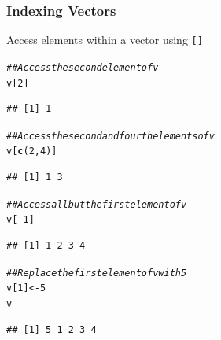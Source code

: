 \documentclass{beamer}\usepackage[]{graphicx}\usepackage[]{color}
\makeatletter
\newcommand{\hlnum}[1]{\textcolor[rgb]{0.686,0.059,0.569}{#1}}%
\newcommand{\hlcom}[1]{\textcolor[rgb]{0.678,0.584,0.686}{\textit{#1}}}%
\newcommand{\hlopt}[1]{\textcolor[rgb]{0,0,0}{#1}}%
\newcommand{\hlstd}[1]{\textcolor[rgb]{0.345,0.345,0.345}{#1}}%
\newcommand{\hlkwb}[1]{\textcolor[rgb]{0.69,0.353,0.396}{#1}}%
\newcommand{\hlkwd}[1]{\textcolor[rgb]{0.737,0.353,0.396}{\textbf{#1}}}%
\newenvironment{kframe}{%
 \def\at@end@of@kframe{}%
 \ifinner\ifhmode%
  \def\at@end@of@kframe{\end{minipage}}%
  \begin{minipage}{\columnwidth}%
 \fi\fi%
 \def\FrameCommand##1{\hskip\@totalleftmargin \hskip-\fboxsep
 \colorbox{shadecolor}{##1}\hskip-\fboxsep
     \hskip-\linewidth \hskip-\@totalleftmargin \hskip\columnwidth}%
 \MakeFramed {\advance\hsize-\width
   \@totalleftmargin\z@ \linewidth\hsize
   \@setminipage}}%
 {\par\unskip\endMakeFramed%
 \at@end@of@kframe}
\newenvironment{knitrout}{}{} %
\makeatother
\begin{document}
\begin{frame}[fragile]\frametitle{Indexing Vectors}
    Access elements within a vector using \texttt{[]}
\begin{knitrout}\footnotesize
{}\color{fgcolor}\begin{kframe}
\begin{alltt}
\hlcom{## Access the second element of v}
\hlstd{v[}\hlnum{2}\hlstd{]}
\end{alltt}
\begin{verbatim}
## [1] 1
\end{verbatim}
\begin{alltt}
\hlcom{## Access the second and fourth elements of v}
\hlstd{v[}\hlkwd{c}\hlstd{(}\hlnum{2}\hlstd{,} \hlnum{4}\hlstd{)]}
\end{alltt}
\begin{verbatim}
## [1] 1 3
\end{verbatim}
\begin{alltt}
\hlcom{## Access all but the first element of v}
\hlstd{v[}\hlopt{-}\hlnum{1}\hlstd{]}
\end{alltt}
\begin{verbatim}
## [1] 1 2 3 4
\end{verbatim}
\begin{alltt}
\hlcom{## Replace the first element of v with 5}
\hlstd{v[}\hlnum{1}\hlstd{]} \hlkwb{<-} \hlnum{5}
\hlstd{v}
\end{alltt}
\begin{verbatim}
## [1] 5 1 2 3 4
\end{verbatim}
\end{kframe}
\end{knitrout}
\end{frame}
\end{document}
